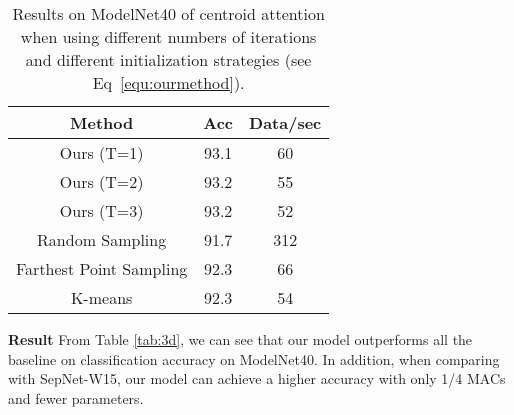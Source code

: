 \documentclass[english]{article}
\begin{document}
\begin{table}[ht]
    \centering
    \caption{Results on ModelNet40 of our method and  various of baselines. Here MACs denotes multiply-add cumulation and Params means the number of parameters in the model. }
    \label{tab:3d}
\end{table}


\begin{table}[ht]
    \centering
   \begin{tabular}{c|c|c}
        \hline
        Method & Acc & Data/sec  \\
        \hline
        Ours (T=1) & 93.1 & 60 \\
        Ours (T=2) & 93.2 & 55 \\
        Ours (T=3) & 93.2 & 52 \\
        \hline
        Random Sampling & 91.7 & 312 \\
        Farthest Point Sampling & 92.3 & 66 \\
        K-means & 92.3 & 54 \\
        \hline

    \end{tabular}
    \caption{Results on ModelNet40 of centroid attention  when using 
    different numbers of iterations   and different initialization strategies (see   Eq~\eqref{equ:ourmethod}).}
    \label{tab:3d2}

\end{table}

\textbf{Result} \space From Table \ref{tab:3d}, we can see that our model outperforms all the baseline on classification accuracy on ModelNet40. In addition, when comparing with SepNet-W15, our model can achieve a higher accuracy with only 1/4 MACs and fewer parameters.
\end{document}
